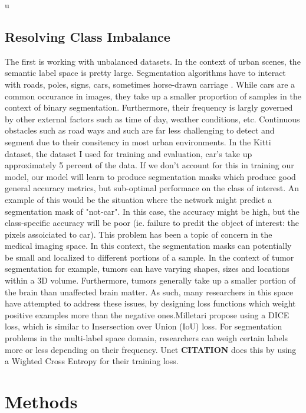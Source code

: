 \documentclass[Location Location Location! : Exploring Image Segmentation Problem In Urban Driving Scenarios]{IEEEtran}
\begin{document}
	u

\subsection{Resolving Class Imbalance}
The first is working with unbalanced datasets. In the context of urban scenes, the semantic label space is pretty large. Segmentation algorithms have to interact with roads, poles, signs, cars, sometimes horse-drawn carriage \cite{b2}. While cars are a common occurance in images, they take up a smaller proportion of samples in the context of binary segmentation. Furthermore, their frequency is largly governed by other external factors such as time of day, weather conditions, etc. Continuous obstacles such as road ways and such are far less challenging to detect and segment due to their consitency in most urban environments. In the Kitti dataset, the dataset I used for training and evaluation, car's take up approximately 5 percent of the data. If we don't account for this in training our model, our model will learn to produce segmentation masks which produce good general accuracy metrics, but sub-optimal performace on the class of interest. An example of this would be the situation where the network might predict a segmentation mask of "not-car". In this case, the accuracy might be high, but the class-specific accuracy will be poor (ie. failure to predit the object of interest: the pixels assoiciated to car). This problem has been a topic of concern in the medical imaging space. In this context, the segmentation masks can potentially be small and localized to different portions of a sample. In the context of tumor segmentation for example, tumors can have varying shapes, sizes and locations within a 3D volume. Furthermore, tumors generally take up a smaller portion of the brain than unaffected brain matter. As such, many researchers in this space have attempted to address these issues, by designing loss functions which weight positive examples more than the negative ones.Milletari \cite{b1} propose using a DICE loss, which is similar to Insersection over Union (IoU) loss. For segmentation problems in the multi-label space domain, researchers can weigh certain labels more or less depending on their frequency. Unet  \textbf{CITATION} does this by using a Wighted Cross Entropy for their training loss. 




\section{Methods}
\end{document}
